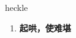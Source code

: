 
\begin{frame}
{\huge heckle}
\begin{center}
\begin{enumerate}\Large
  \item \textbf{起哄，使难堪}
\end{enumerate}
\end{center}
\end{frame}
